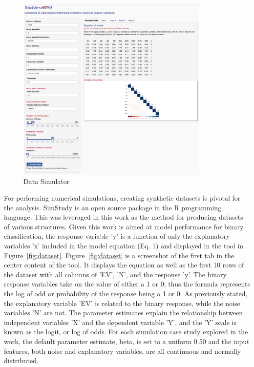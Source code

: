 \documentclass{llncs}
\begin{document}
\begin{figure}
\centering
\includegraphics[width=0.85\textwidth]{full-tool.png}
\caption{Data Simulator}
\label{fig:rshiny}
\end{figure}


\noindent 
For performing numerical simulations, creating synthetic datasets is pivotal for the analysis. SimStudy is an open source package in the R programming language. This was leveraged in this work as the method for producing datasets of various structures. Given this work is aimed at model performance for binary classification, the response variable 'y' is a function of only the explanatory variables 'x' included in the model equation (Eq. 1) and displayed in the tool in Figure~\ref{fig:dataset}.  Figure~\ref{fig:dataset} is a screenshot of the first tab in the center content of the tool.  It displays the equation as well as the first 10 rows of the dataset with all columns of 'EV', 'N', and the response 'y'. The binary response variables take on the value of either a 1 or 0; thus the formula represents the log of odd or probability of the response being a 1 or 0. As previously stated, the explanatory variable 'EV' is related to the binary response, while the noise variables 'N' are not. The parameter estimates explain the relationship between independent variables 'X' and the dependent variable 'Y', and the 'Y' scale is known as the logit, or log of odds. For each simulation case study explored in the work, the default parameter estimate, beta, is set to a uniform 0.50 and the input features, both noise and explanatory variables, are all continuous and normally distributed. 
\end{document}
